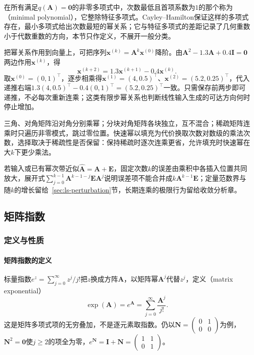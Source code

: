在所有满足$q(\bm A)=\bm0$的非零多项式中，次数最低且首项系数为$1$的那个称为（minimal polynomial），它整除特征多项式。Cayley--Hamilton保证这样的多项式存在，最小多项式给出次数最短的幂关系；它与特征多项式的差距记录了几何重数小于代数重数的方向，本节只作定义，不展开一般分类。

把幂关系作用到向量上，可把序列$\bm x^{(k)}=\bm A^k\bm x^{(0)}$降阶。由$\bm A^2-1.3\bm A+0.4\bm I=\bm0$两边作用$\bm x^{(k)}$，得
\[
 \bm x^{(k+2)}=1.3\bm x^{(k+1)}-0.4\bm x^{(k)}.
\]
取$\bm x^{(0)}=(0,1)^\top$，逐步相乘得$\bm x^{(1)}=(4,0.5)^\top$、$\bm x^{(2)}=(5.2,0.25)^\top$，代入递推右端$1.3(4,0.5)^\top-0.4(0,1)^\top=(5.2,0.25)^\top$一致。只需保存前两步即可递推，不必每次重新连乘；这类有限步幂关系也判断线性输入生成的可达方向何时停止增加。

三角、对角矩阵沿对角分别乘幂；分块对角矩阵各块独立，互不混合；稀疏矩阵连乘时只遍历非零模式，跳过零位置。快速幂以填充为代价换取次数对数级的乘法次数，选择取决于稀疏性是否保留：保持稀疏时逐次连乘更省，允许填充时快速幂在大$k$下更少乘法。

若输入或已有幂次带近似$\widehat{\bm A}=\bm A+\bm E$，固定次数$k$的误差由乘积中各插入位置共同放大，展开式$\sum_{j=0}^{k-1}\bm A^{k-1-j}\bm E\bm A^j$说明误差项不能合并成$k\bm A^{k-1}\bm E$；定量范数界与随$k$的增长留给~\ref{sec:ls-perturbation}节，长期连乘的极限行为留给收敛分析章。

\subsection{矩阵指数}
\label{sec:ls-matrix-exponential}

\subsubsection{定义与性质}

\paragraph{矩阵指数的定义}

标量指数$e^z=\sum_{j=0}^{\infty}z^j/j!$把$z$换成方阵$\bm A$，以矩阵幂$\bm A^j$代替$z^j$，定义（matrix exponential）
\begin{equation}
 \exp(\bm A)=e^{\bm A}=\sum_{j=0}^{\infty}\frac{\bm A^j}{j!}.
 \label{eq:matrix-analysis-matrix-exponential}
\end{equation}
这是矩阵多项式项的无穷叠加，不是逐元素取指数。仍以$\bm N=\begin{pmatrix}0&1\\0&0\end{pmatrix}$为例，$\bm N^2=\bm0$使$j\geq2$的项全为零，$e^{\bm N}=\bm I+\bm N=\begin{pmatrix}1&1\\0&1\end{pmatrix}$。


